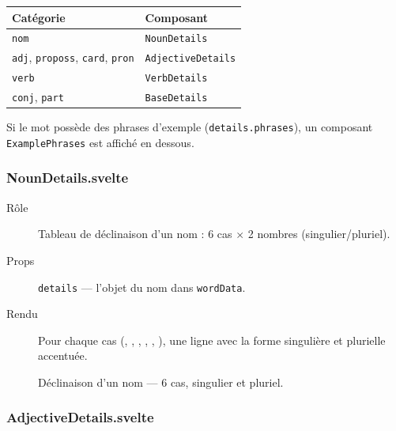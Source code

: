 \begin{center}
\begin{tabular}{ll}
  \toprule
  \textbf{Catégorie} & \textbf{Composant} \\
  \midrule
  \texttt{nom} & \texttt{NounDetails} \\
  \texttt{adj}, \texttt{proposs}, \texttt{card}, \texttt{pron} & \texttt{AdjectiveDetails} \\
  \texttt{verb} & \texttt{VerbDetails} \\
  \texttt{conj}, \texttt{part} & \texttt{BaseDetails} \\
  \bottomrule
\end{tabular}
\end{center}

Si le mot possède des phrases d'exemple (\texttt{details.phrases}), un composant \texttt{ExamplePhrases} est affiché en dessous.

\subsubsection{NounDetails.svelte}

\begin{description}
  \item[Rôle] Tableau de déclinaison d'un nom : 6 cas $\times$ 2 nombres (singulier/pluriel).
  \item[Props] \texttt{details} --- l'objet du nom dans \texttt{wordData}.
  \item[Rendu] Pour chaque cas (, , , , , ), une ligne avec la forme singulière et plurielle accentuée.
\end{description}

\begin{figure}[ht]
  \centering
  \caption{Déclinaison d'un nom --- 6 cas, singulier et pluriel.}
  \label{fig:noun-table}
\end{figure}

\subsubsection{AdjectiveDetails.svelte}

